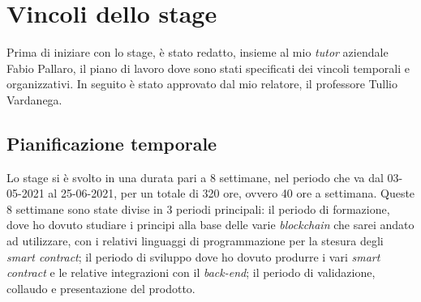 
\section{Vincoli dello stage}
Prima di iniziare con lo stage, è stato redatto, insieme al mio \emph{tutor} aziendale Fabio Pallaro, il piano di lavoro dove sono stati specificati dei vincoli temporali e organizzativi. In seguito è stato approvato dal mio relatore, il professore Tullio Vardanega.

\subsection{Pianificazione temporale}
Lo stage si è svolto in una durata pari a 8 settimane, nel periodo che va dal 03-05-2021 al 25-06-2021, per un totale di 320 ore, ovvero 40 ore a settimana. Queste 8 settimane sono state divise in 3 periodi principali: il periodo di formazione, dove ho dovuto studiare i principi alla base delle varie \emph{blockchain} che sarei andato ad utilizzare, con i relativi linguaggi di programmazione per la stesura degli \emph{smart contract}; il periodo di sviluppo dove ho dovuto produrre i vari \emph{smart contract} e le relative integrazioni con il \emph{back-end}; il periodo di validazione, collaudo e presentazione del prodotto. \\

